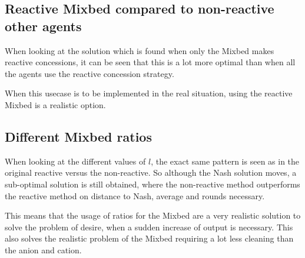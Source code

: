 \clearpage
\subsection{Reactive Mixbed compared to non-reactive other agents}
When looking at the solution which is found when only the Mixbed makes reactive concessions, it can be seen that this is a lot more optimal than when all the agents use the reactive concession strategy. 

When this usecase is to be implemented in the real situation, using the reactive Mixbed is a realistic option. 

\subsection{Different Mixbed ratios}
When looking at the different values of $l$, the exact same pattern is seen as in the original reactive versus the non-reactive. So although the Nash solution moves, a sub-optimal solution is still obtained, where the non-reactive method outperforms the reactive method on distance to Nash, average and rounds necessary.

This means that the usage of ratios for the Mixbed are a very realistic solution to solve the problem of desire, when a sudden increase of output is necessary. This also solves the realistic problem of the Mixbed requiring a lot less cleaning than the anion and cation.


